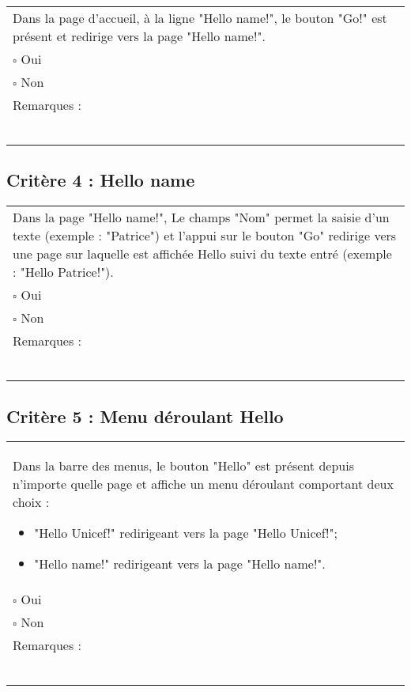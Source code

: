 	\begin{center}
    	 		\begin{tabular}[h]{|p{}|}
			\hline
				Dans la page d'accueil, à la ligne "Hello name!", le bouton "Go!" est présent et redirige vers la page "Hello name!". \\
				$\square$ Oui  \\ $\square$ Non \\\hline Remarques : \\ ~\\
			 \\\hline
     		\end{tabular}
  		\end{center}	
  		
  		
  		
  	\subsection*{Critère 4 : Hello name}
	
	\begin{center}
    	 		\begin{tabular}[h]{|p{}|}
			\hline
				Dans la page "Hello name!", Le champs "Nom" permet la saisie d'un texte (exemple : "Patrice") et l'appui sur le bouton "Go" redirige vers une page sur laquelle est affichée Hello suivi du texte entré (exemple : "Hello Patrice!").  \\
				$\square$ Oui  \\ $\square$ Non \\\hline Remarques : \\ ~\\
			 \\\hline
     		\end{tabular}
  		\end{center}	
  		
  			
  	\subsection*{Critère 5 : Menu déroulant Hello}
	
	\begin{center}
    	 		\begin{tabular}[h]{|p{}|}
			\hline
				Dans la barre des menus, le bouton "Hello" est présent depuis n'importe quelle page et affiche un menu déroulant comportant deux choix : 
				\begin{itemize}
					\item "Hello Unicef!" redirigeant vers la page "Hello Unicef!";
					\item "Hello name!" redirigeant vers la page "Hello name!".
				\end{itemize}				 \\
				$\square$ Oui  \\ $\square$ Non \\\hline Remarques : \\ ~\\
			 \\\hline
     		\end{tabular}
  		\end{center}	
  		
